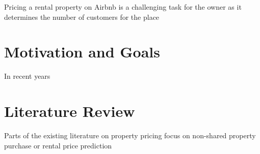 Pricing a rental property on Airbnb is a challenging task for the owner as it
determines the number of customers for the place

\section{Motivation and Goals}
\label{sect_intro_motivation}

In recent years


\section{Literature Review}
\label{sect_intro_literature_review}

Parts of the existing literature on property pricing focus on non-shared
property purchase or rental price prediction

